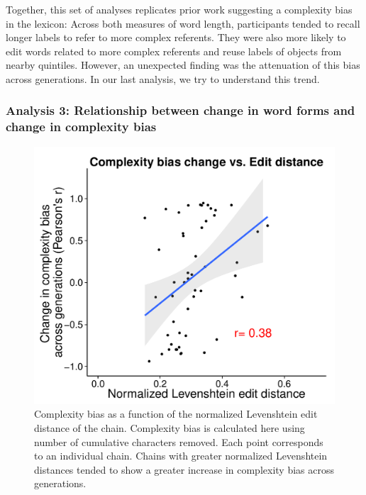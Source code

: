 Together, this set of analyses replicates prior work suggesting a complexity bias in the lexicon: Across both measures of word length, participants tended to recall longer labels to refer to more complex referents. They were also more likely to edit words related to more complex referents and reuse labels of objects from nearby quintiles. However, an unexpected finding was the attenuation of this bias across generations. In our last analysis, we try to understand this trend.


  
\subsubsection{Analysis  3: Relationship between change in word forms and change in complexity bias} 


\begin{figure}[t]
\begin{center}
\includegraphics[width = .6\linewidth]{figs/change_plot.pdf}
\end{center}
\caption{Complexity bias as a function of the normalized Levenshtein edit distance of the chain. Complexity bias is calculated here using number of cumulative characters removed. Each point corresponds to an individual chain. Chains with greater normalized Levenshtein distances tended to show a greater increase in complexity bias across generations.}
\label{fig:levcbias}
\end{figure}



